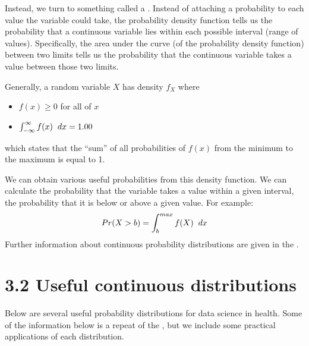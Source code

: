 \documentclass[letterpaper,10pt,english]{jupyterBook}
\begin{document}
\sphinxAtStartPar
Instead, we turn to something called a . Instead of attaching a probability to each value the variable could take, the probability density function tells us the probability that a continuous variable lies within each possible interval (range of values). Specifically, the area under the curve (of the probability density function) between two limits tells us the probability that the continuous variable takes a value between those two limits.

\sphinxAtStartPar
Generally, a random variable \(X\) has density \(f_X\) where
\begin{itemize}
\item {} 
\sphinxAtStartPar
\(f(x) \geq 0\) for all of \(x\)

\item {} 
\sphinxAtStartPar
\(\int_{-\infty}^{\infty} f(x) \hspace{0.2cm} dx = 1.00\)

\end{itemize}

\sphinxAtStartPar
which states that the “sum” of all probabilities of \(f(x)\) from the minimum to the maximum is equal to 1.

\sphinxAtStartPar
We can obtain various useful probabilities from this density function. We can calculate the probability that the variable takes a value within a given interval, the probability that it is below or above a given value. For example:
\begin{equation*}
\begin{split}Pr(X>b) = \int_{b}^{max} f(X) \hspace{0.2cm} dx \end{split}
\end{equation*}
\sphinxAtStartPar
Further information about continuous probability distributions are given in the .


\section{3.2 Useful continuous distributions}
\label{\detokenize{03.c. Continuous Probability Distributions:useful-continuous-distributions}}\label{\detokenize{03.c. Continuous Probability Distributions::doc}}
\sphinxAtStartPar
Below are several useful probability distributions for data science in health. Some of the information below is a repeat of the , but we include some practical applications of each distribution.
\end{document}
